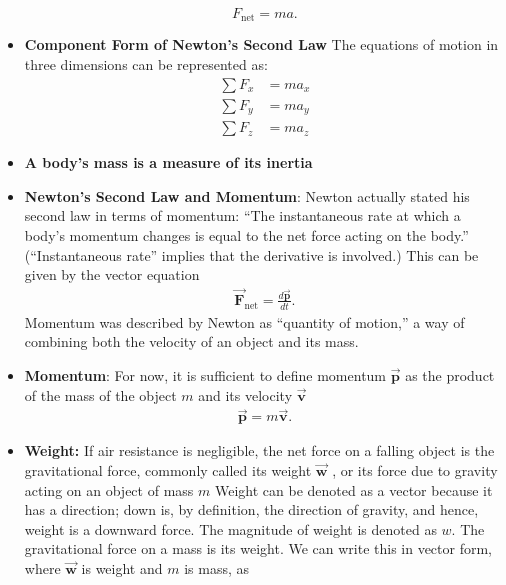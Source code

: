 \documentclass{report}
\begin{document}
\begin{itemize}
                \[
                    F_{\text{net}} = ma.
                \]
            \item \textbf{Component Form of Newton’s Second Law}
                The equations of motion in three dimensions can be represented as:
                \begin{align}
                    \sum F_x &= m a_x \\
                    \sum F_y &= m a_y \\
                    \sum F_z &= m a_z
                \end{align}
            \item \textbf{A body’s mass is a measure of its inertia}
            \item \textbf{Newton’s Second Law and Momentum}: Newton actually stated his second law in terms of momentum: “The instantaneous rate at which a body’s momentum changes is equal to the net force acting on the body.” (“Instantaneous rate” implies that the derivative is involved.) This can be given by the vector equation
                \begin{align*}
                    \vec{\mathbf{F}}_{\text{net}} = \frac{d\vec{\mathbf{p}}}{dt}
                .\end{align*}
                Momentum was described by Newton as “quantity of motion,” a way of combining both the velocity of an object and its mass.
            \item \textbf{Momentum}: For now, it is sufficient to define momentum $\vec{\mathbf{p}}$ as the product of the mass of the object $m$ and its velocity $\vec{\mathbf{v}}$
                \begin{align*}
                    \vec{\mathbf{p}} = m\vec{\mathbf{v}}
                .\end{align*}
            \item \textbf{Weight:} If air resistance is negligible, the net force on a falling object is the gravitational force, commonly called its weight  $\vec{\mathbf{w}}$ , or its force due to gravity acting on an object of mass $m$
                \bigbreak \noindent 
                Weight can be denoted as a vector because it has a direction; down is, by definition, the direction of gravity, and hence, weight is a downward force. The magnitude of weight is denoted as $w$.
                \bigbreak \noindent 
                The gravitational force on a mass is its weight. We can write this in vector form, where $\vec{\mathbf{w}}$ is weight and $m$ is mass, as
                \begin{align*}

\end{align*}
\end{itemize}
\end{document}
